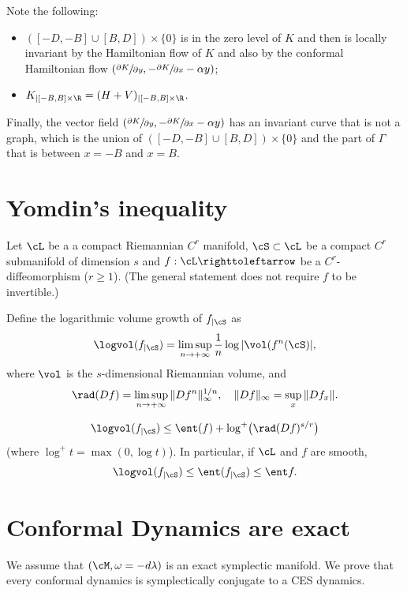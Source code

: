 Note the following:
\begin{itemize}
\item $([-D, -B]\cup[B, D])\times\{ 0\}$ is in the zero level of $K$ and then is locally inva\-riant by the Hamiltonian flow of $K$ and also by the conformal Hamiltonian flow \hbox{$(\sfrac{\partial K}{\partial y}, -\sfrac{\partial K}{\partial x}-\alpha y)$};
\item $K_{|[-B, B]\times \R}=(H+V)_{|[-B, B]\times \R}$.
\end{itemize}
Finally, the vector field $(\sfrac{\partial K}{\partial y}, -\sfrac{\partial K}{\partial x}-\alpha y)$ has an invariant curve that is not a graph, which is the union of $([-D, -B]\cup[B, D])\times\{ 0\}$ and the part of $\Gamma$ that is between $x=-B$ and $x=B$.

\appendix

\section{Yomdin's inequality}
\label{AYomdin}

Let $\cL$ be a a compact Riemannian $C^r$ manifold, $\cS \subset \cL$ be a compact $C^r$ submanifold of dimension $s$ and $f : \cL \righttoleftarrow$ be a { $C^r$-diffeomorphism} ($r \geq 1$). (The general statement does not require $f$ to be invertible.)

Define the logarithmic volume growth of $f_{|\cS}$ as
\[
\logvol(f_{|\cS}) = \limsup_{n \to +\infty} \frac{1}{n} \log | \vol(f^{n}(\cS)|,
\]
where $\vol$ is the $s$-dimensional Riemannian volume, and
\[
\rad (Df) = \limsup_{n \to +\infty} \|Df^n\|_\infty^{1/n}, \quad \|Df\|_\infty = \sup_x \|Df_x\|.
\]

\skpt\begin{theorem}\mbox{}\vspace*{-\baselineskip}
\[
\logvol (f_{|\cS}) \leq \ent (f) + \log^+\bigl(\rad(Df)^{s/r}\bigr)
\]
(where $\log^+ t = \max (0, \log t)$). In particular, if $\cL$ and $f$ are smooth,
\[
\logvol (f_{|\cS}) \leq \ent (f_{|\cS}) \leq \ent f.
\]
\end{theorem}

\section{Conformal Dynamics are exact} \label{Aconfexact}

We assume that $(\cM, \omega=-d\lambda)$ is an exact symplectic manifold. We prove that every conformal dynamics is symplectically conjugate to a CES dynamics.

